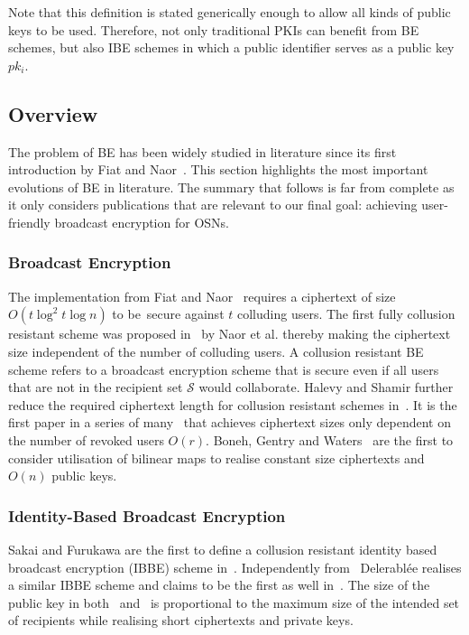 Note that this definition is stated generically enough to allow all kinds of public keys to be used. Therefore, not only traditional PKIs can benefit from BE schemes, but also IBE schemes in which a public identifier  serves as a public key $pk_i$.

\subsection{Overview}
\label{sec:evolution_of_be}
The problem of BE has been widely studied in literature since its first introduction by Fiat and Naor~\cite{art:FiatN93}. This section highlights the most important evolutions of BE in literature. The summary that follows is far from complete as it only considers publications that are relevant to our final goal: achieving user-friendly broadcast encryption for OSNs.

\subsubsection{Broadcast Encryption}
The implementation from Fiat and Naor~\cite{art:FiatN93} requires a ciphertext of size  $O \left( t \log^2 t \log n \right)$ to be~secure against $t$ colluding users. The first fully collusion resistant scheme was proposed in~\cite{art:NaorNL01} by Naor et al. thereby making the ciphertext size independent of the number of colluding users. A collusion resistant BE scheme refers to a broadcast encryption scheme that is secure even if all users that are not in the recipient set $\mathcal{S}$ would collaborate. Halevy and Shamir further reduce the required ciphertext length for collusion resistant schemes in~\cite{art:HalevyS02}. It is the first paper in a series of many~\cite{art:DodisF02,art:GoodrichST04,art:LewkoSW08} that achieves ciphertext sizes only dependent on the number of revoked users $O \left( r \right)$. Boneh, Gentry and Waters~\cite{art:BonehBG05} are the first to consider utilisation of bilinear maps to realise constant size ciphertexts and $O \left( n \right)$ public keys.

\subsubsection{Identity-Based Broadcast Encryption}
Sakai and Furukawa are the first to define a collusion resistant identity based broadcast encryption (IBBE) scheme in~\cite{art:SakaiF07}. Independently from~\cite{art:SakaiF07} Delerabl\'{e}e realises a similar IBBE scheme and claims to be the first as well in~\cite{art:Delerablee07}.  The size of the public key in both~\cite{art:SakaiF07} and~\cite{art:Delerablee07} is proportional to the maximum size of the intended set of recipients while realising short ciphertexts and private keys. 

